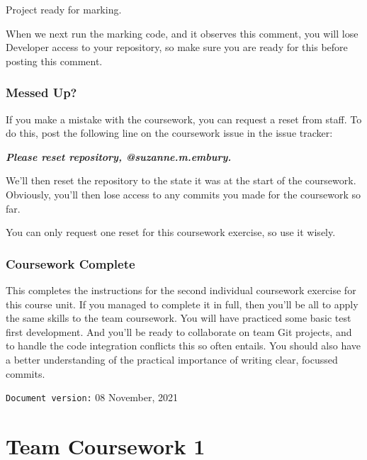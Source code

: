 \documentclass[
]{book}
\newenvironment{Shaded}{\begin{snugshade}}{\end{snugshade}}
\newcommand{\InformationTok}[1]{\textcolor[rgb]{0.56,0.35,0.01}{\textbf{\textit{#1}}}}
\newcommand{\NormalTok}[1]{#1}
\begin{document}
\begin{Shaded}
\begin{Highlighting}[]
\NormalTok{Project ready for marking.}
\end{Highlighting}
\end{Shaded}

When we next run the marking code, and it observes this comment, you will lose Developer access to your repository, so make sure you are ready for this before posting this comment.

\hypertarget{messi}{%
\subsection{Messed Up?}\label{messi}}

If you make a mistake with the coursework, you can request a reset from staff. To do this, post the following line on the coursework issue in the issue tracker:

\begin{Shaded}
\begin{Highlighting}[]
\InformationTok{    Please reset repository, @suzanne.m.embury.}
\end{Highlighting}
\end{Shaded}

We'll then reset the repository to the state it was at the start of the coursework. Obviously, you'll then lose access to any commits you made for the coursework so far.

You can only request one reset for this coursework exercise, so use it wisely.

\hypertarget{cw2fin}{%
\subsection{Coursework Complete}\label{cw2fin}}

This completes the instructions for the second individual coursework exercise for this course unit. If you managed to complete it in full, then you'll be all to apply the same skills to the team coursework. You will have practiced some basic test first development. And you'll be ready to collaborate on team Git projects, and to handle the code integration conflicts this so often entails. You should also have a better understanding of the practical importance of writing clear, focussed commits.

\texttt{Document\ version:} 08 November, 2021

\hypertarget{dealing}{%
\chapter{Team Coursework 1}\label{dealing}}
\end{document}
